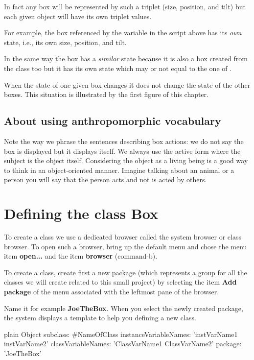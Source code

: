 \documentclass[10pt,twoside,english]{_support/latex/sbabook/sbabook}
\begin{document}
In fact any box will be represented by such a triplet (size, position, and tilt) but each given object will have its own triplet values.  

For example, the box referenced by the variable  in the script above has its \textit{own} state, i.e., its own size, position, and tilt.  

In the same way the box  has a \textit{similar} state because it is also a box created from the class  too but it has its own state which may or not equal to the one of .  

When the state of one given box changes it does not change the state of the other boxes.  This situation is illustrated by the first figure of this chapter.  
\subsection{About using anthropomorphic vocabulary}
Note the way we phrase the sentences describing box actions:  we do not say the box is displayed but it displays itself.  We always use
the active form where the subject is the object itself.  Considering the object as a living being is a good way to think in an object-oriented manner.  Imagine talking about an animal or a person you will say that the person acts and not is acted by others.  
\section{Defining the class Box}
To create a class we use a dedicated browser called the system browser
 or class browser.  To open such a browser, bring up the default menu and chose the menu item \textbf{open...} and the item \textbf{browser} (command-b).

To create a class, create first a new package (which represents a
group for all the classes we will create related to this small
project) by selecting the item \textbf{Add package} of the menu associated with the
leftmost pane of the browser. 

Name it for example \textbf{JoeTheBox}.  When you select the newly created package,
the system displays a template to help you defining a new class. 

\begin{displaycode}{plain}
Object subclass: #NameOfClass
   instanceVariableNames: 'instVarName1 instVarName2'
   classVariableNames: 'ClassVarName1 ClassVarName2'
   package: 'JoeTheBox'
\end{displaycode}
\end{document}

